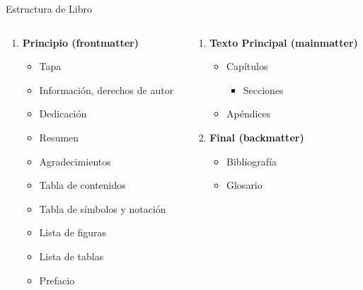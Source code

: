 \documentclass[11pt]{beamer}
\newcounter{savedenum}
\newcommand*{\saveenum}{\setcounter{savedenum}{\theenumi}}
\newcommand*{\resume}{\setcounter{enumi}{\thesavedenum}}
\begin{document}
\begin{frame}{Estructura de Libro}
\begin{columns}[t]
\begin{column}{0.5\textwidth}
  \begin{enumerate}
    \item \textbf{Principio (frontmatter)}
      \begin{itemize}
        \item Tapa
        \item Información, derechos de autor
        \item Dedicación
        \item Resumen
        \item Agradecimientos
        \item Tabla de contenidos
        \item Tabla de símbolos y notación
        \item Lista de figuras
        \item Lista de tablas
        \item Prefacio
      \end{itemize}
    \saveenum
  \end{enumerate}
\end{column}

\begin{column}{0.5\textwidth}
  \begin{enumerate}
    \resume
    \item \textbf{Texto Principal (mainmatter)}
      \begin{itemize}
        \item Capítulos
        \begin{itemize}
          \item Secciones
        \end{itemize}
        \item Apéndices
      \end{itemize}
      
    \item \textbf{Final (backmatter)}
      \begin{itemize}
        \item Bibliografía
        \item Glosario
      \end{itemize}
  \end{enumerate}
\end{column}
\end{columns}
\end{frame}
\end{document}
